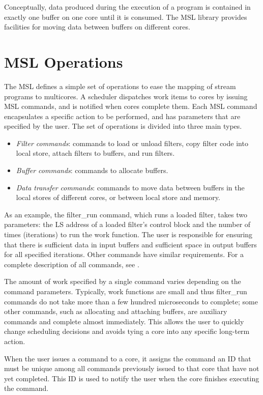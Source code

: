 Conceptually, data produced during the execution of a program is
contained in exactly one buffer on one core until it is consumed. The
MSL library provides facilities for moving data between buffers on
different cores.
 
\section{MSL Operations}

The MSL defines a simple set of operations to ease the mapping of stream
programs to multicores. A scheduler dispatches work items to cores by
issuing MSL commands, and is notified when cores complete
them. Each MSL command encapsulates a specific action to be
performed, and has parameters that are specified by the user. The
set of operations is divided into three main types.
\begin{itemize}
\item {\it Filter commands}: commands to load or unload filters, copy filter code into local store, attach filters to buffers, and run filters.
\item {\it Buffer commands}: commands to allocate buffers.
\item {\it Data transfer commands}: commands to move data between buffers in the local stores of different cores, or between local store and memory.
\end{itemize}

As an example, the \textsf{filter\_run} command, which runs a loaded
filter, takes two parameters: the LS address of a loaded filter's
control block and the number of times (iterations) to run the work function.
The user is responsible for ensuring that there is sufficient
data in input buffers and sufficient space in output buffers for all
specified iterations. Other commands have similar requirements. For a
complete description of all commands, see \cite{dxzhang-meng-07}.

The amount of work specified by a single command varies depending on the
command parameters. Typically, work functions are small and thus
\textsf{filter\_run} commands do not take more than a few hundred
microseconds to complete; some other commands, such as allocating and
attaching buffers, are auxiliary commands and complete almost
immediately. This allows the user to quickly change scheduling
decisions and avoids tying a core into any specific long-term action.

When the user issues a command to a core, it assigns the command an ID
that must be unique among all commands previously issued to that core
that have not yet completed. This ID is used to notify the user when the
core finishes executing the command.

